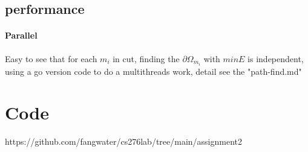 \documentclass[letterpaper,12pt]{article}
\begin{document}
\subsection{performance}
\paragraph{Parallel}Easy to see that for each $m_i$ in cut, finding the $\partial \Omega_{m_i}$ with $minE$ is independent, using a go version code to do a multithreads work,
detail see the "path-find.md"

\section{Code}
https://github.com/fangwater/cs276lab/tree/main/assignment2
\end{document}
